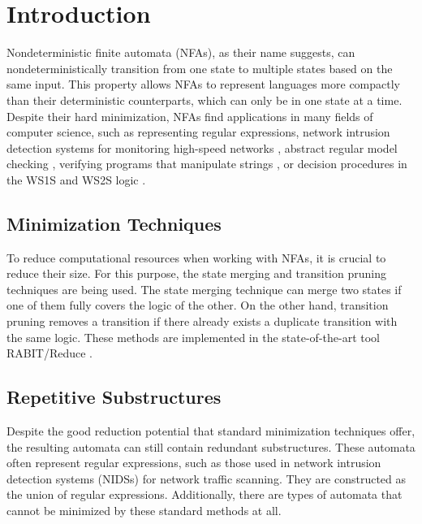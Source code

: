 \documentclass{ExcelAtFIT}
\affiliation{*%
  \href{mailto:xsedym02@stud.fit.vutbr.cz}{xsedym02@stud.fit.vutbr.cz},
  \textit{Faculty of Information Technology, Brno University of Technology}}
\begin{document}
\startdocument


\section{Introduction}
	Nondeterministic finite automata (NFAs), as their name suggests, can nondeterministically transition from one state to multiple states based on the same input. This property allows NFAs to represent languages more compactly than their deterministic counterparts, which can only be in one state at a time. Despite their hard minimization, NFAs find applications in many fields of computer science, such as representing regular expressions, network intrusion detection systems for monitoring high-speed networks \cite{FPGA_based_network_scaning, ApproxRed}, abstract regular model checking \cite{ARMC}, verifying programs that manipulate strings \cite{String_constraints_for_ver}, or decision procedures in the WS1S and WS2S logic \cite{On_equivalence_checking, Nested_antichains_for_WS1S}.

	\subsection*{Minimization Techniques}
		To reduce computational resources when working with NFAs, it is crucial to reduce their size. For this purpose, the state merging \cite{Oldest_Merge,Simulation_based_minimization,On_nfa_reduction} and transition pruning \cite{Simulation_based_minimization, Lorenzo_prunning_saturation} techniques are being used. The state merging technique can merge two states if one of them fully covers the logic of the other. On the other hand, transition pruning removes a transition if there already exists a duplicate transition with the same logic. These methods are implemented in the state-of-the-art tool RABIT/Reduce \cite{RABIT}.

	\subsection*{Repetitive Substructures}
		Despite the good reduction potential that standard minimization techniques offer, the resulting automata can still contain redundant substructures. These automata often represent regular expressions, such as those used in network intrusion detection systems (NIDSs) for network traffic scanning. They are constructed as the union of regular expressions. Additionally, there are types of automata that cannot be minimized by these standard methods at all.
\end{document}
